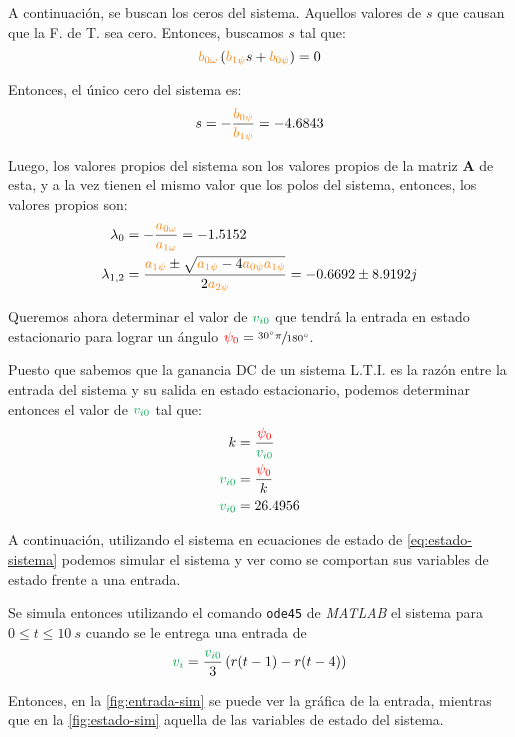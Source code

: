A continuación, se buscan los ceros del sistema. Aquellos valores de $s$
que causan que la F. de T. sea cero. Entonces, buscamos $s$ tal que:
\begin{equation}
  \nara{\nara{b_{0\omega}}}\left(\nara{b_{1\psi}}s + \nara{b_{0\psi}}\right) = 0
\end{equation}

Entonces, el único cero del sistema es:
\begin{equation}
  s = -\frac{\nara{b_{0\psi}}}{\nara{b_{1\psi}}} = -4.6843
\end{equation}

Luego, los valores propios del sistema son los valores propios de la matriz
$\pmb{A}$ de esta, y a la vez tienen el mismo valor que los polos del
sistema, entonces, los valores propios son:
\begin{align}
  \lambda_{0} &= -\frac{\nara{a_{0\omega}}}{\nara{a_{1\omega}}} = -1.5152 \\
  \lambda_{1,2} &= \frac{\nara{a_{1\psi}} \pm \sqrt{\nara{a_{1\psi}} - 4 \nara{a_{0\psi}a_{1\psi}}}}{2\nara{a_{2\psi}}} = -0.6692 \pm 8.9192j
\end{align}

Queremos ahora determinar el valor de $\verd{v_{i0}}$ que tendrá la
entrada en estado estacionario para lograr un ángulo $\mathbin{\color{red}\psi_{0}} = \sfrac{\ang{30}\pi}{\ang{180}}$.

Puesto que sabemos que la ganancia DC de un sistema L.T.I. es la razón entre la
entrada del sistema y su salida en estado estacionario, podemos determinar
entonces el valor de $\verd{v_{i0}}$ tal que:
\begin{align}
  k &= \frac{\rojo{\psi_{0}}}{\verd{v_{i0}}} \\
  \verd{v_{i0}} &= \frac{\rojo{\psi_{0}}}{k} \\
  \verd{v_{i0}} &= 26.4956
\end{align}

A continuación, utilizando el sistema en ecuaciones de estado de \eqref{eq:estado-sistema}
podemos simular el sistema y ver como se comportan sus variables de estado frente
a una entrada.

Se simula entonces utilizando el comando \texttt{ode45} de \textit{MATLAB} el
sistema para $0 \leq t \leq 10\ \unit{s}$ cuando se le entrega una entrada de
\begin{equation}
  \verd{v_{i}} = \frac{\verd{v_{i0}}}{3}\left(r(t-1) - r(t-4)\right)
\end{equation}

Entonces, en la \autoref{fig:entrada-sim} se puede ver la gráfica de la entrada,
mientras que en la \autoref{fig:estado-sim} aquella de las variables de estado
del sistema.

